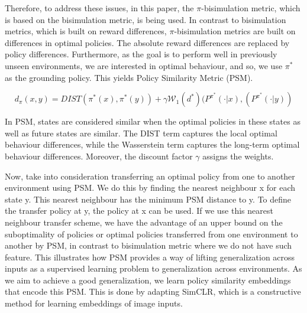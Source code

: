 \documentclass{usiinftr}
\begin{document}
Therefore, to address these issues, in this paper, the $\pi$-bisimulation metric, which is based on the bisimulation metric, is being used. In contrast to bisimulation metrics, which is built on reward differences, $\pi$-bisimulation metrics are built on differences in optimal policies. The absolute reward differences are replaced by policy differences. Furthermore, as the goal is to perform well in previously unseen environments, we are interested in optimal behaviour, and so, we use $\pi^*$ as the grounding policy. This yields Policy Similarity Metric (PSM).

\begin{equation}
    d_{\pi}(x,y) = DIST(\pi^*(x), \pi^*(y)) + \gamma \mathcal{W}_1(d^*) (P^{\pi^*}(\cdot | x), (P^{\pi^*}(\cdot | y)) 
\end{equation}
\cite{castro2020scalable}

In PSM, states are considered similar when the optimal policies in these states as well as future states are similar. The DIST term captures the local optimal behaviour differences, while the Wasserstein term captures the long-term optimal behaviour differences. Moreover, the discount factor $\gamma$ assigns the weights. \cite{castro2020scalable}

Now, take into consideration transferring an optimal policy from one to another environment using PSM. We do this by finding the nearest neighbour x for each state y. This nearest neighbour has the minimum PSM distance to y. To define the transfer policy at y, the policy at x can be used. If we use this nearest neighbour transfer scheme, we have the advantage of an upper bound on the suboptimality of policies or optimal policies transferred from one environment to another by PSM, in contrast to bisimulation metric where we do not have such feature. 
\cite{castro2020scalable}
This illustrates how PSM provides a way of lifting generalization across inputs as a supervised learning problem to generalization across environments. As we aim to achieve a good generalization, we learn policy similarity embeddings that encode this PSM. This is done by adapting SimCLR, which is a constructive method for learning embeddings of image inputs.
\end{document}
